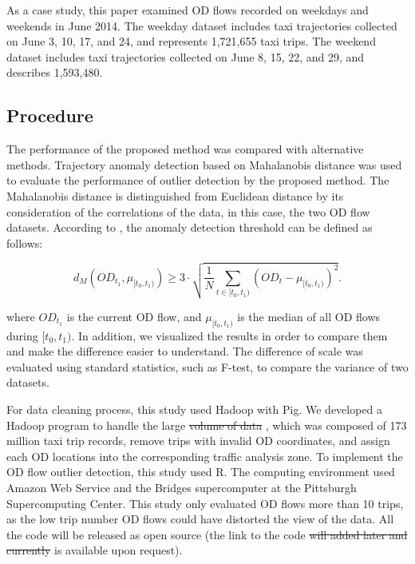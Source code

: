 \documentclass[a4paper,UKenglish]{lipics-v2018}
\providecommand{\DIFadd}[1]{{\protect\color{blue}\uwave{#1}}} %
\providecommand{\DIFdel}[1]{{\protect\color{red}\sout{#1}}}                      %
\providecommand{\DIFaddbegin}{} %
\providecommand{\DIFaddend}{} %
\providecommand{\DIFdelbegin}{} %
\providecommand{\DIFdelend}{} %
\begin{document}
As a case study, this paper examined OD flows recorded on weekdays and weekends in June 2014.
The weekday dataset includes taxi trajectories collected on June 3, 10, 17, and 24, and represents 1,721,655 taxi trips.
The weekend dataset includes taxi trajectories collected on June 8, 15, 22, and 29, and describes 1,593,480. 

\subsection{Procedure}

The performance of the proposed method was compared with alternative methods.
Trajectory anomaly detection based on Mahalanobis distance \cite{pan13ACMGIS} was used to evaluate the performance of outlier detection by the proposed method.
The Mahalanobis distance is distinguished from Euclidean distance by its consideration of the correlations of the data, in this case, the two OD flow datasets. 
According to \cite{pan13ACMGIS}, the anomaly detection threshold can be defined as follows:

\begin{equation*}
d_M(OD_{t_1}, \mu_{[t_0,t_1)}) \geq 3\cdot \sqrt{\frac{1}{N}\sum_{t \in [t_0,t_1)} (OD_{t} - \mu_{[t_0,t_1)})^2} .
\end{equation*}

where $OD_{t_1}$ is the current OD flow, and $\mu_{[t_0,t_1)}$ is the median of all OD flows during $[t_0,t_1)$.
In addition, we visualized the results in order to compare them and make the difference easier to understand.
The difference of scale was evaluated using standard statistics, such as F-test, to compare the variance of two datasets. 

For data cleaning process, this study used Hadoop with Pig.
We developed a Hadoop program to handle the large \DIFdelbegin \DIFdel{volume of data }\DIFdelend \DIFaddbegin \DIFadd{data volume}\DIFaddend , which was composed of 173 million taxi trip records, remove trips with invalid OD coordinates, and assign each OD locations into the corresponding traffic analysis zone.
To implement the OD flow outlier detection, this study used R.
The computing environment used Amazon Web Service and the Bridges supercomputer at the Pittsburgh Supercomputing Center. 
This study only evaluated OD flows more than 10 trips, as the low trip number OD flows could have distorted the view of the data.
All the code will be released as open source (the link to the code \DIFdelbegin \DIFdel{will added later and currently }\DIFdelend is available upon request).
\end{document}
